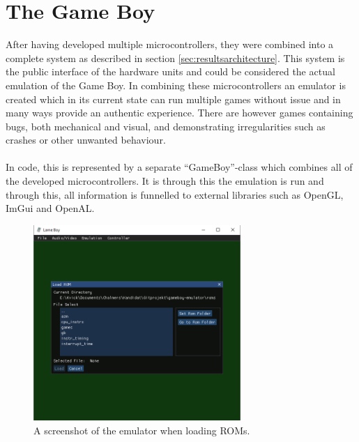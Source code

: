 \section{The Game Boy}
After having developed multiple microcontrollers, they were combined into a complete system as described in section \ref{sec:resultsarchitecture}. This system is the public interface of the hardware units and could be considered the actual emulation of the Game Boy. In combining these microcontrollers an emulator is created which in its current state can run multiple games without issue and in many ways provide an authentic experience. There are however games containing bugs, both mechanical and visual, and demonstrating irregularities such as crashes or other unwanted behaviour.
\\\\
In code, this is represented by a separate ``GameBoy''-class which combines all of the developed microcontrollers. It is through this the emulation is run and through this, all information is funnelled to external libraries such as OpenGL, ImGui and OpenAL.

\begin{figure}[H]
    \centering
    \includegraphics[width=0.7\textwidth]{figures/emulator.png}
    \caption{A screenshot of the emulator when loading ROMs.}
    \label{fig:emulator_picture}
\end{figure}